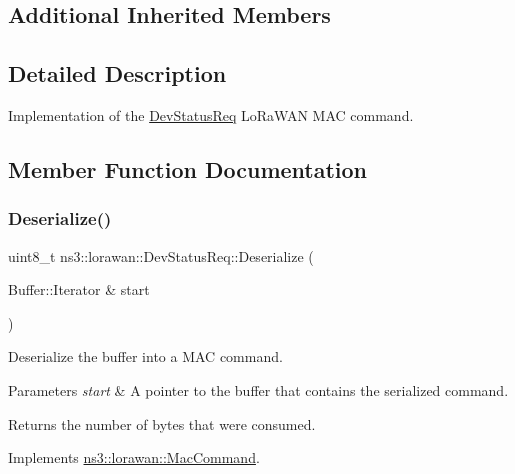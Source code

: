 \subsection*{Additional Inherited Members}


\subsection{Detailed Description}
Implementation of the \hyperlink{classns3_1_1lorawan_1_1DevStatusReq}{Dev\+Status\+Req} Lo\+Ra\+W\+AN M\+AC command. 

\subsection{Member Function Documentation}
\mbox{\label{classns3_1_1lorawan_1_1DevStatusReq_a6802f5824758e56ebe7317ba4a6d50b6}} 
\subsubsection{\texorpdfstring{Deserialize()}{Deserialize()}}
{\footnotesize\ttfamily uint8\+\_\+t ns3\+::lorawan\+::\+Dev\+Status\+Req\+::\+Deserialize (\begin{DoxyParamCaption}\item[{Buffer\+::\+Iterator \&}]{start }\end{DoxyParamCaption})\hspace{0.3cm}{\ttfamily [virtual]}}

Deserialize the buffer into a M\+AC command.


\begin{DoxyParams}{Parameters}
{\em start} & A pointer to the buffer that contains the serialized command. \\
\hline
\end{DoxyParams}
\begin{DoxyReturn}{Returns}
the number of bytes that were consumed. 
\end{DoxyReturn}


Implements \hyperlink{classns3_1_1lorawan_1_1MacCommand_af12d223a71a67196bce498f1240eda75}{ns3\+::lorawan\+::\+Mac\+Command}.

\mbox{\label{classns3_1_1lorawan_1_1DevStatusReq_ad550f7d8f599f48d54dea36d87ab4ab9}} 
